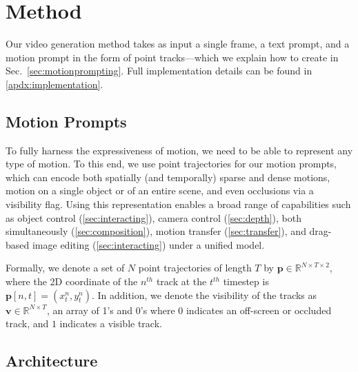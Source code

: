 \section{Method}

Our video generation method takes as input a single frame, a text prompt, and a motion prompt in the form of point tracks---which we explain how to create in Sec.~\ref{sec:motionprompting}. Full implementation details can be found in \cref{apdx:implementation}. %

\subsection{Motion Prompts}


To fully harness the expressiveness of motion, we need to be able to represent any type of motion. 
To this end, we use point trajectories for our motion prompts, which can encode both spatially (and temporally) sparse and dense motions, motion on a single object or of an entire scene, and even occlusions via a visibility flag.
Using this representation enables a broad range of capabilities such as object control (\cref{sec:interacting}), camera control (\cref{sec:depth}), both simultaneously (\cref{sec:composition}), motion transfer (\cref{sec:transfer}), and drag-based image editing (\cref{sec:interacting}) under a unified model.

Formally, we denote a set of $N$ point trajectories of length $T$ by $\mathbf{p} \in \mathbb{R}^{N \times T \times 2}$, where the 2D coordinate of the $n^{th}$ track at the $t^{th}$ timestep is $\mathbf{p}[n, t] = (x_t^n, y_t^n)$.  In addition, we denote the visibility of the tracks as $\mathbf{v} \in \mathbb{R}^{N \times T}$, an array of 1's and 0's where $0$ indicates an off-screen or occluded track, and $1$ indicates a visible track.


\subsection{Architecture}

